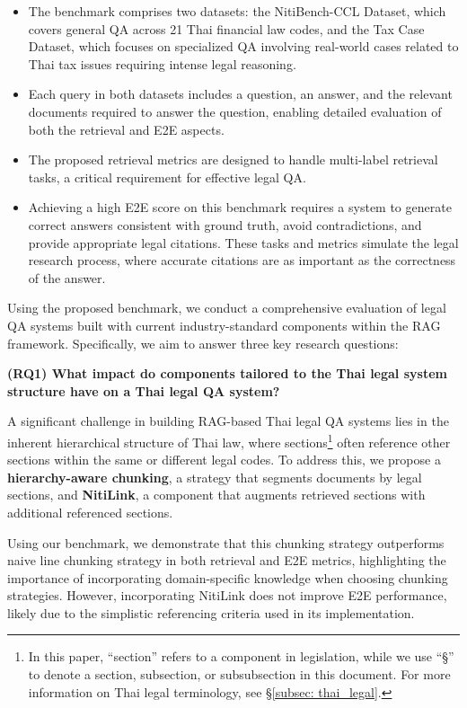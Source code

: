 \begin{itemize}  
    \item The benchmark comprises two datasets: the NitiBench-CCL Dataset, which covers general QA across 21 Thai financial law codes, and the Tax Case Dataset, which focuses on specialized QA involving real-world cases related to Thai tax issues requiring intense legal reasoning.  
    
    \item Each query in both datasets includes a question, an answer, and the relevant documents required to answer the question, enabling detailed evaluation of both the retrieval and E2E aspects.  
    
    \item The proposed retrieval metrics are designed to handle multi-label retrieval tasks, a critical requirement for effective legal QA.  
    
    \item Achieving a high E2E score on this benchmark requires a system to generate correct answers consistent with ground truth, avoid contradictions, and provide appropriate legal citations. 
    These tasks and metrics simulate the legal research process, where accurate citations are as important as the correctness of the answer.  
\end{itemize}

Using the proposed benchmark, we conduct a comprehensive evaluation of legal QA systems built with current industry-standard components within the RAG framework. 
%
Specifically, we aim to answer three key research questions:

\textbf{(RQ1) What impact do components tailored to the Thai legal system structure have on a Thai legal QA system?}  

A significant challenge in building RAG-based Thai legal QA systems lies in the inherent hierarchical structure of Thai law, where sections\footnote{In this paper, ``section'' refers to a component in legislation, while we use ``\S'' to denote a section, subsection, or subsubsection in this document. For more information on Thai legal terminology, see \S\ref{subsec: thai_legal}.} often reference other sections within the same or different legal codes. 
%
To address this, we propose a \textbf{hierarchy-aware chunking}, a strategy that segments documents by legal sections, and \textbf{NitiLink}, a component that augments retrieved sections with additional referenced sections.  

Using our benchmark, we demonstrate that this chunking strategy outperforms naive line chunking strategy in both retrieval and E2E metrics, highlighting the importance of incorporating domain-specific knowledge when choosing chunking strategies. 
%
However, incorporating NitiLink does not improve E2E performance, likely due to the simplistic referencing criteria used in its implementation.

